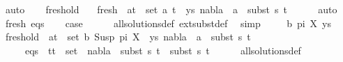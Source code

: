 \begin{isabellebody}
\ auto\isanewline
\ \ \isamarkupfalse%
\ fresh{\isacharunderscore}{\kern0pt}old\ \isamarkupfalse%
\isanewline
\ \ fresh{\isacharcolon}{\kern0pt}\ {\isachardoublequoteopen}{\isasymforall}\ {\isacharparenleft}{\kern0pt}a{\isacharcomma}{\kern0pt}t{\isacharprime}{\kern0pt}{\isacharparenright}{\kern0pt}\ {\isasymin}\ set\ {\isacharparenleft}{\kern0pt}{\isacharparenleft}{\kern0pt}a{\isacharcomma}{\kern0pt}\ t{\isacharparenright}{\kern0pt}\ {\isacharhash}{\kern0pt}\ ys{\isacharparenright}{\kern0pt}{\isachardot}{\kern0pt}\ nabla{}\ {\isasymturnstile}\ a\ {\isasymsharp}\ subst\ s{}\ t{\isacharprime}{\kern0pt}{\isachardoublequoteclose}\isanewline
\ \ \ \ \isamarkupfalse%
\ auto\isanewline
\ \ \isamarkupfalse%
\ fresh\ eqs\isanewline
\ \ \isamarkupfalse%
\ {\isacharquery}{\kern0pt}case\isanewline
\ \ \ \ \isamarkupfalse%
\ all{\isacharunderscore}{\kern0pt}solutions{\isacharunderscore}{\kern0pt}def\ ext{\isacharunderscore}{\kern0pt}subst{\isacharunderscore}{\kern0pt}def\ \isamarkupfalse%
\ simp\isanewline
{}\isamarkupfalse%
\isanewline
\ \ \isamarkupfalse%
\ {\isacharparenleft}{\kern0pt}{}\ b\ pi\ X\ ys{\isacharparenright}{\kern0pt}\isanewline
\ \ \isamarkupfalse%
\ fresh{\isacharunderscore}{\kern0pt}old{\isacharcolon}{\kern0pt}\ {\isachardoublequoteopen}{\isasymforall}\ {\isacharparenleft}{\kern0pt}a{\isacharcomma}{\kern0pt}t{\isacharparenright}{\kern0pt}\ {\isasymin}\ set\ {\isacharparenleft}{\kern0pt}{\isacharparenleft}{\kern0pt}b{\isacharcomma}{\kern0pt}\ Susp\ pi\ X{\isacharparenright}{\kern0pt}\ {\isacharhash}{\kern0pt}\ ys{\isacharparenright}{\kern0pt}{\isachardot}{\kern0pt}\ nabla{}\ {\isasymturnstile}\ a\ {\isasymsharp}\ subst\ s{}\ t{\isachardoublequoteclose}\isanewline
\ \ \ \ \ eqs{\isacharcolon}{\kern0pt}\ {\isachardoublequoteopen}{\isasymforall}\ {\isacharparenleft}{\kern0pt}t{}{\isacharcomma}{\kern0pt}t{}{\isacharparenright}{\kern0pt}\ {\isasymin}\ set\ {\isacharbrackleft}{\kern0pt}{\isacharbrackright}{\kern0pt}{\isachardot}{\kern0pt}\ nabla{}\ {\isasymturnstile}\ subst\ s{}\ t{}\ {\isasymapprox}\ subst\ s{}\ t{}{\isachardoublequoteclose}\isanewline
\ \ \ \ \isamarkupfalse%
\ all{\isacharunderscore}{\kern0pt}solutions{\isacharunderscore}{\kern0pt}def\ \isamarkupfalse%

\end{isabellebody}

